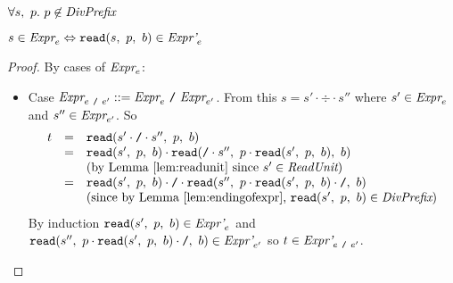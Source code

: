 \documentclass[preprint,10pt]{sigplanconf}
\begin{document}
\begin{lemma}\mbox{}
  
  \( \forall s,~p. ~p \not \in \textit{DivPrefix} \)

  \( s \in \textit{Expr}_{e} \Leftrightarrow \texttt{read}(s,~p,~b) \in \textit{Expr'}_{e} \)
\end{lemma}
\begin{proof}
  
  By cases of \( \textit{Expr}_{e} \):

  \begin{itemize}

  \item Case \(\textit{Expr}_{e~\texttt{/}~e'} ::= \textit{Expr}_{e} ~\texttt{/}~ \textit{Expr}_{e'} \).
    From this \( s = s' \cdot \div \cdot s'' \) where \( s' \in
    \textit{Expr}_{e} \) and \( s'' \in \textit{Expr}_{e'} \). So
    \[
    \begin{array}{rcl}
      t &=& \texttt{read}(s' \cdot \texttt{/} \cdot s'',~p,~b)
      \\
      &=& \texttt{read}(s',~p,~b) \cdot \texttt{read}(\texttt{/} \cdot s'',~
        p\cdot \texttt{read}(s',~p,~b)
      ,~b)
      \\
      &&\textrm{(by Lemma \ref{lem:readunit} since \( s' \in \textit{ReadUnit} \))}
      \\
      &=& \texttt{read}(s',~p,~b) \cdot \texttt{/} \cdot 
      \texttt{read}(s'',~
        p\cdot \texttt{read}(s',~p,~b) \cdot \texttt{/}
      ,~b)
      \\
      &&\textrm{(since by Lemma \ref{lem:endingofexpr}, \(
        \texttt{read}(s',~p,~b) \in \textit{DivPrefix}\))}
      \\
    \end{array}
    \]
    By induction \( \texttt{read}(s',~p,~b) \in \textit{Expr'}_{e} \) and
    \( 
      \texttt{read}(s'',~
        p\cdot \texttt{read}(s',~p,~b) \cdot \texttt{/}
      ,~b) \in \textit{Expr'}_{e'}
      \) so \( t \in \textit{Expr'}_{e ~\texttt{/}~ e'} \).

  \end{itemize}
\end{proof}
\end{document}
